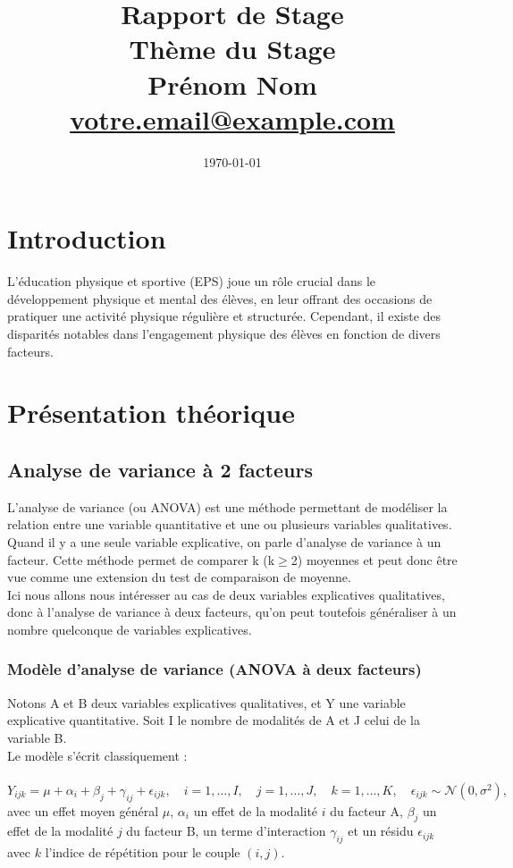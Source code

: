 \documentclass[12pt,a4paper]{report}
\title{
	\textbf{Rapport de Stage}\\[0.5cm]
	\textbf{Thème du Stage}\\
	\vspace{2cm}
	\textbf{Prénom Nom}\\
	\vspace{1cm}
	\href{mailto:votre.email@example.com}{votre.email@example.com}
}
\author{}
\date{\today}
\begin{document}
	
	\maketitle
	
	\newpage
	\tableofcontents
	\newpage
	
	\section{Introduction}
	L'éducation physique et sportive (EPS) joue un rôle crucial dans le développement physique et mental des élèves, en leur offrant des occasions de pratiquer une activité physique régulière et structurée. Cependant, il existe des disparités notables dans l'engagement physique des élèves en fonction de divers facteurs.
	
	\section{Présentation théorique}
	\subsection{Analyse de variance à 2 facteurs}
	L'analyse de variance (ou ANOVA) est une méthode permettant de modéliser la relation entre une variable quantitative et une ou plusieurs variables qualitatives. Quand il y a une seule variable explicative, on parle d'analyse de variance à un facteur. Cette méthode permet de comparer k (k$ \geq $2) moyennes et peut donc être vue comme une extension du test de comparaison de moyenne.\\
	
	Ici nous allons nous intéresser au cas de deux variables explicatives qualitatives, donc à l'analyse de variance à deux facteurs, qu'on peut toutefois généraliser à un nombre quelconque de variables explicatives.\\
	
	\subsubsection{Modèle d'analyse de variance (ANOVA à deux facteurs)}
	Notons A et B deux variables explicatives qualitatives, et Y une variable explicative quantitative. Soit I le nombre de modalités de A et J celui de la variable B.\\
	Le modèle s'écrit classiquement : \\ \\
	\begin{equation}
		Y_{ijk} = \mu + \alpha_i + \beta_j + \gamma_{ij} + \epsilon_{ijk}, \quad i = 1, \ldots, I, \quad j = 1, \ldots, J, \quad k = 1, \ldots, K, \quad \epsilon_{ijk} \sim \mathcal{N}(0,\sigma^2),
	\end{equation}
	avec un effet moyen général $\mu$, $\alpha_i$ un effet de la modalité $i$ du facteur A, $\beta_j$ un effet de la modalité $j$ du facteur B, un terme d'interaction $\gamma_{ij}$ et un résidu $\epsilon_{ijk}$ avec $k$ l'indice de répétition pour le couple $(i,j)$.\\
	
\end{document}
